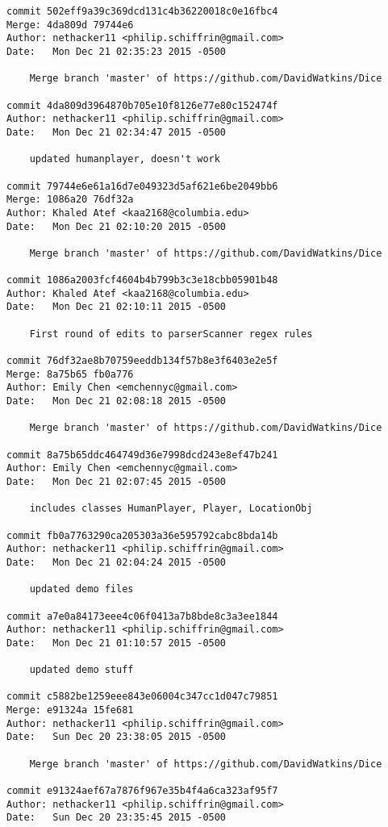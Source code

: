\begin{verbatim}
commit 502eff9a39c369dcd131c4b36220018c0e16fbc4
Merge: 4da809d 79744e6
Author: nethacker11 <philip.schiffrin@gmail.com>
Date:   Mon Dec 21 02:35:23 2015 -0500

    Merge branch 'master' of https://github.com/DavidWatkins/Dice

commit 4da809d3964870b705e10f8126e77e80c152474f
Author: nethacker11 <philip.schiffrin@gmail.com>
Date:   Mon Dec 21 02:34:47 2015 -0500

    updated humanplayer, doesn't work

commit 79744e6e61a16d7e049323d5af621e6be2049bb6
Merge: 1086a20 76df32a
Author: Khaled Atef <kaa2168@columbia.edu>
Date:   Mon Dec 21 02:10:20 2015 -0500

    Merge branch 'master' of https://github.com/DavidWatkins/Dice

commit 1086a2003fcf4604b4b799b3c3e18cbb05901b48
Author: Khaled Atef <kaa2168@columbia.edu>
Date:   Mon Dec 21 02:10:11 2015 -0500

    First round of edits to parserScanner regex rules

commit 76df32ae8b70759eeddb134f57b8e3f6403e2e5f
Merge: 8a75b65 fb0a776
Author: Emily Chen <emchennyc@gmail.com>
Date:   Mon Dec 21 02:08:18 2015 -0500

    Merge branch 'master' of https://github.com/DavidWatkins/Dice

commit 8a75b65ddc464749d36e7998dcd243e8ef47b241
Author: Emily Chen <emchennyc@gmail.com>
Date:   Mon Dec 21 02:07:45 2015 -0500

    includes classes HumanPlayer, Player, LocationObj

commit fb0a7763290ca205303a36e595792cabc8bda14b
Author: nethacker11 <philip.schiffrin@gmail.com>
Date:   Mon Dec 21 02:04:24 2015 -0500

    updated demo files

commit a7e0a84173eee4c06f0413a7b8bde8c3a3ee1844
Author: nethacker11 <philip.schiffrin@gmail.com>
Date:   Mon Dec 21 01:10:57 2015 -0500

    updated demo stuff

commit c5882be1259eee843e06004c347cc1d047c79851
Merge: e91324a 15fe681
Author: nethacker11 <philip.schiffrin@gmail.com>
Date:   Sun Dec 20 23:38:05 2015 -0500

    Merge branch 'master' of https://github.com/DavidWatkins/Dice

commit e91324aef67a7876f967e35b4f4a6ca323af95f7
Author: nethacker11 <philip.schiffrin@gmail.com>
Date:   Sun Dec 20 23:35:45 2015 -0500


\end{verbatim}
